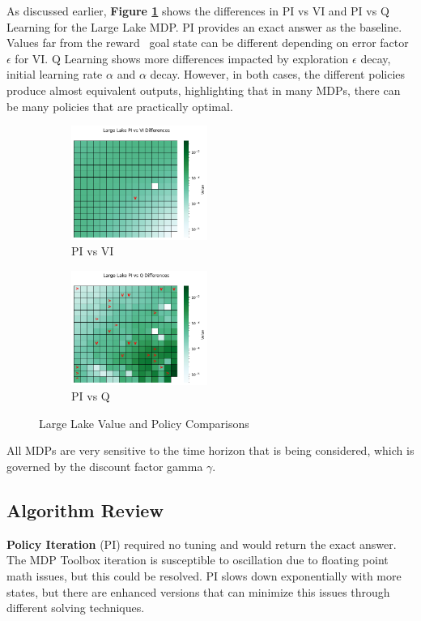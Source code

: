\documentclass[letterpaper]{article} %
\begin{document}
As discussed earlier, \textbf{Figure \ref{fig:large_lake_comparisions}} shows the differences in PI vs VI and PI vs Q Learning for the Large Lake MDP.  PI provides an exact answer as the baseline.  Values far from the reward \ goal state can be different depending on error factor $\epsilon$ for VI.  Q Learning shows more differences impacted by exploration $\epsilon$ decay, initial learning rate $\alpha$ and  $\alpha$ decay.   However, in both cases, the different policies produce almost equivalent outputs, highlighting that in many MDPs, there can be many policies that are practically optimal.

\begin{figure}[!htb]
	\begin{subfigure}[b]{0.25\textwidth}
		\centering
		\includegraphics[width=1.75in]{Figures/Large_Lake_PI_vs_VI_Differences_.png}
		\caption{PI vs VI}
  	\end{subfigure}%
	\begin{subfigure}[b]{0.25\textwidth}
		\centering
		\includegraphics[width=1.75in]{Figures/Large_Lake_PI_vs_Q_Differences_.png}
		\caption{PI vs Q}
  	\end{subfigure}%
\caption{Large Lake Value and Policy Comparisons}
\label{fig:large_lake_comparisions}
\end{figure}

All MDPs are very sensitive to the time horizon that is being considered, which is governed by the discount factor gamma $\gamma$.  

\subsection{Algorithm Review}

\textbf{Policy Iteration} (PI) required no tuning and would return the exact answer.  The MDP Toolbox iteration is susceptible to oscillation due to floating point math issues, but this could be resolved.  PI slows down exponentially with more states, but there are enhanced versions that can minimize this issues through different solving techniques.  
\end{document}
